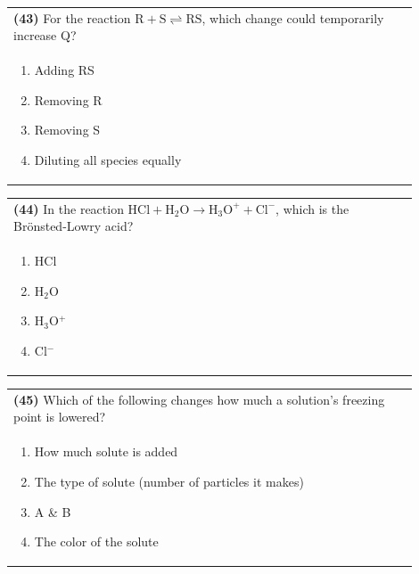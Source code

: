 \documentclass{article}
\begin{document}
\noindent\begin{tabular}{|p{0.9\linewidth}|}
\hline
\textbf{(43)} For the reaction $\text{R} + \text{S} \rightleftharpoons \text{RS}$, which change could temporarily increase Q?\\[0.2cm]
\begin{minipage}[t]{0.85\linewidth}
\begin{enumerate}[label=\alph*.]
\item Adding RS
\item Removing R
\item Removing S
\item Diluting all species equally
\end{enumerate}
\end{minipage}\\[0.2cm]
\hline
\end{tabular}

\noindent\begin{tabular}{|p{0.9\linewidth}|}
\hline
\textbf{(44)} In the reaction $\text{HCl} + \text{H}_2\text{O} \rightarrow \text{H}_3\text{O}^+ + \text{Cl}^-$, which is the Brönsted-Lowry acid?\\[0.2cm]
\begin{minipage}[t]{0.85\linewidth}
\begin{enumerate}[label=\alph*.]
\item HCl
\item H$_2$O
\item H$_3$O$^+$
\item Cl$^-$
\end{enumerate}
\end{minipage}\\[0.2cm]
\hline
\end{tabular}

\noindent\begin{tabular}{|p{0.9\linewidth}|}
\hline
\textbf{(45)} Which of the following changes how much a solution’s freezing point is lowered?\\[0.2cm]
\begin{minipage}[t]{0.85\linewidth}
\begin{enumerate}[label=\alph*.]
\item How much solute is added
\item The type of solute (number of particles it makes)
\item A \& B
\item The color of the solute
\end{enumerate}
\end{minipage}\\[0.2cm]
\hline
\end{tabular}
\end{document}
